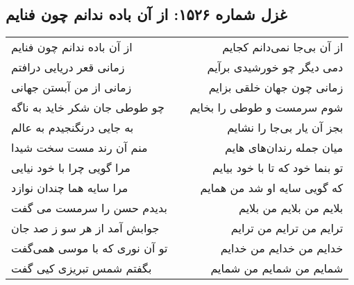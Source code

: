\begin{center}
\section*{غزل شماره ۱۵۲۶: از آن باده ندانم چون فنایم}
\label{sec:1526}
\begin{longtable}{l p{0.5cm} r}
از آن باده ندانم چون فنایم
&&
از آن بی‌جا نمی‌دانم کجایم
\\
زمانی قعر دریایی درافتم
&&
دمی دیگر چو خورشیدی برآیم
\\
زمانی از من آبستن جهانی
&&
زمانی چون جهان خلقی بزایم
\\
چو طوطی جان شکر خاید به ناگه
&&
شوم سرمست و طوطی را بخایم
\\
به جایی درنگنجیدم به عالم
&&
بجز آن یار بی‌جا را نشایم
\\
منم آن رند مست سخت شیدا
&&
میان جمله رندان‌های هایم
\\
مرا گویی چرا با خود نیایی
&&
تو بنما خود که تا با خود بیایم
\\
مرا سایه هما چندان نوازد
&&
که گویی سایه او شد من همایم
\\
بدیدم حسن را سرمست می گفت
&&
بلایم من بلایم من بلایم
\\
جوابش آمد از هر سو ز صد جان
&&
ترایم من ترایم من ترایم
\\
تو آن نوری که با موسی همی‌گفت
&&
خدایم من خدایم من خدایم
\\
بگفتم شمس تبریزی کیی گفت
&&
شمایم من شمایم من شمایم
\\
\end{longtable}
\end{center}
